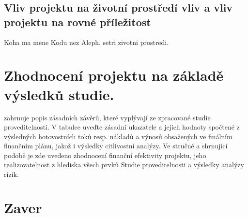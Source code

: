 \documentclass[
	12pt, oneside, printed, final, 
	table,   %
	lof,     %
	lot     %
]{fithesis3}
\begin{document}
{\section{ Vliv projektu na životní prostředí vliv a vliv projektu na rovné příležitost}

Koha ma mene Kodu nez Aleph, setri zivotni prostredi.

\chapter{Zhodnocení projektu na základě výsledků studie.}

 zahrnuje popis zásadních závěrů, které vyplývají ze zpracované studie
proveditelnosti. V tabulce uveďte zásadní ukazatele a jejich hodnoty spočtené
z výsledných hotovostních toků resp. nákladů a výnosů obsažených ve finálním
finančním plánu, jakož i výsledky citlivostní analýzy. Ve stručné a shrnující podobě je
zde uvedeno zhodnocení finanční efektivity projektu, jeho realizovatelnost z hlediska
všech prvků Studie proveditelnosti a výsledky analýzy rizik. 

\chapter{Zaver}


\makeatletter\thesis@blocks@clear\makeatother
{} %


\makeatletter\thesis@blocks@clear\makeatother
\renewcommand{\theHchapter}{A\arabic{chapter}}
\appendix %


\printbibliography[title={Seznam literatury},heading=bibintoc]


}
\end{document}
